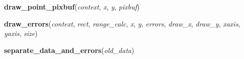 \hspace{.8\funcindent}\begin{boxedminipage}{\funcwidth}

    \raggedright \textbf{draw\_point\_pixbuf}(\textit{context}, \textit{x}, \textit{y}, \textit{pixbuf})

\setlength{\parskip}{2ex}
\setlength{\parskip}{1ex}
    \end{boxedminipage}

    \label{pygtk_chart:line_chart:draw_errors}

    \vspace{0.5ex}

\hspace{.8\funcindent}\begin{boxedminipage}{\funcwidth}

    \raggedright \textbf{draw\_errors}(\textit{context}, \textit{rect}, \textit{range\_calc}, \textit{x}, \textit{y}, \textit{errors}, \textit{draw\_x}, \textit{draw\_y}, \textit{xaxis}, \textit{yaxis}, \textit{size})

\setlength{\parskip}{2ex}
\setlength{\parskip}{1ex}
    \end{boxedminipage}

    \label{pygtk_chart:line_chart:separate_data_and_errors}

    \vspace{0.5ex}

\hspace{.8\funcindent}\begin{boxedminipage}{\funcwidth}

    \raggedright \textbf{separate\_data\_and\_errors}(\textit{old\_data})

\setlength{\parskip}{2ex}
\setlength{\parskip}{1ex}
    \end{boxedminipage}

    \label{pygtk_chart:line_chart:graph_new_from_function}

    \vspace{0.5ex}

